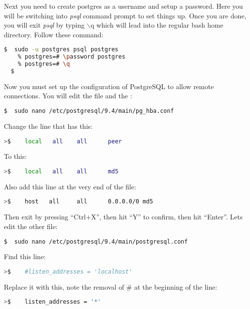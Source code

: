Next you need to create postgres as a username and setup a password. Here you will be switching into \emph{psql} command prompt to set things up. Once you are done, you will exit \emph{psql} by typing $\backslash$q which will lead into the regular bash home directory. Follow these command:

\begin{lstlisting}[language=bash]
  $  sudo -u postgres psql postgres
    % postgres=# \password postgres
    % postgres=# \q
  $
\end{lstlisting}

\noindent
Now you must set up the configuration of PostgreSQL to allow remote connections. You will edit the  file and the :

\begin{lstlisting}[language=bash]
  $  sudo nano /etc/postgresql/9.4/main/pg_hba.conf
\end{lstlisting}

\noindent
Change the line that has this:
\begin{lstlisting}[language=bash]
  >$    local   all    all      peer
\end{lstlisting}
\noindent
To this:
\begin{lstlisting}[language=bash]
  >$    local   all    all      md5
\end{lstlisting}

\noindent
Also add this line at the very end of the file:
\begin{lstlisting}[language=bash]
  >$    host   all     all      0.0.0.0/0 md5
\end{lstlisting}

\noindent
Then exit by pressing ``Ctrl+X'', then hit ``Y'' to confirm, then hit ``Enter''. Lets edit the other file:

\begin{lstlisting}[language=bash]
  $  sudo nano /etc/postgresql/9.4/main/postgresql.conf
\end{lstlisting}

\noindent
Find this line:
\begin{lstlisting}[language=bash]
  >$    #listen_addresses = 'localhost'
\end{lstlisting}

\noindent
Replace it with this, note the removal of  \# at the beginning of the line:

\begin{lstlisting}[language=bash]
  >$    listen_addresses = '*'
\end{lstlisting}


